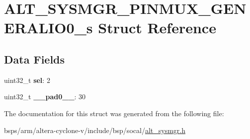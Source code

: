 \hypertarget{structALT__SYSMGR__PINMUX__GENERALIO0__s}{}\section{A\+L\+T\+\_\+\+S\+Y\+S\+M\+G\+R\+\_\+\+P\+I\+N\+M\+U\+X\+\_\+\+G\+E\+N\+E\+R\+A\+L\+I\+O0\+\_\+s Struct Reference}
\label{structALT__SYSMGR__PINMUX__GENERALIO0__s}
\subsection*{Data Fields}
\begin{DoxyCompactItemize}
\item 
\mbox{\label{structALT__SYSMGR__PINMUX__GENERALIO0__s_a9ff45fa3dcbceb059bf49dffa9820712}} 
uint32\+\_\+t {\bfseries sel}\+: 2
\item 
\mbox{\label{structALT__SYSMGR__PINMUX__GENERALIO0__s_a8db39dd288364673e892abd5d98a5b27}} 
uint32\+\_\+t {\bfseries \+\_\+\+\_\+pad0\+\_\+\+\_\+}\+: 30
\end{DoxyCompactItemize}


The documentation for this struct was generated from the following file\+:\begin{DoxyCompactItemize}
\item 
bsps/arm/altera-\/cyclone-\/v/include/bsp/socal/\mbox{\hyperlink{alt__sysmgr_8h}{alt\+\_\+sysmgr.\+h}}\end{DoxyCompactItemize}
